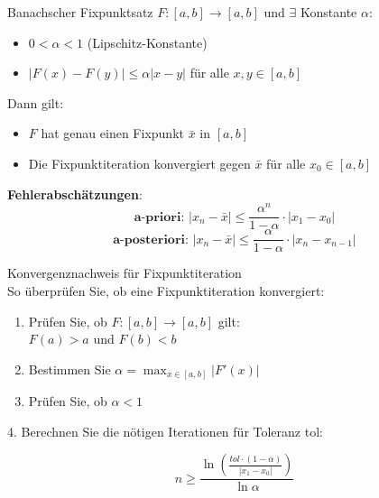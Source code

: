 \begin{lemma}{Banachscher Fixpunktsatz}
$F:[a,b] \rightarrow [a,b]$ und $\exists$ Konstante $\alpha$:
\begin{itemize}
    \item $0 < \alpha < 1$ (Lipschitz-Konstante)
    \item $|F(x)-F(y)| \leq \alpha|x-y|$ für alle $x,y \in [a,b]$
\end{itemize}
\vspace{2mm}


\begin{minipage}[t]{0.35\textwidth}
    Dann gilt:
\begin{itemize}
    \item $F$ hat genau einen Fixpunkt $\bar{x}$ in $[a,b]$
    \item Die Fixpunktiteration konvergiert gegen $\bar{x}$ für alle $x_0 \in [a,b]$
\end{itemize}
\end{minipage}
\hspace{2mm}
\begin{minipage}[t]{0.55\textwidth}
    \textbf{Fehlerabschätzungen}:
    \vspace{-2mm}\\
    $$\textbf{a-priori: } |x_n-\bar{x}| \leq \frac{\alpha^n}{1-\alpha} \cdot |x_1-x_0|$$
    $$\textbf{a-posteriori: } |x_n-\bar{x}| \leq \frac{\alpha}{1-\alpha} \cdot |x_n-x_{n-1}|$$
\end{minipage}
\end{lemma}

\begin{KR}{Konvergenznachweis für Fixpunktiteration}\\
So überprüfen Sie, ob eine Fixpunktiteration konvergiert:
\begin{enumerate}
    \item Prüfen Sie, ob $F:[a,b] \rightarrow [a,b]$ gilt:\\
           $F(a) > a$ und $F(b) < b$
    \item Bestimmen Sie $\alpha = \max_{x \in [a,b]} |F'(x)|$
    \item Prüfen Sie, ob $\alpha < 1$
\end{enumerate}

\begin{minipage}[t]{0.45\textwidth}
    4. Berechnen Sie die nötigen Iterationen für Toleranz tol:
\end{minipage}
\begin{minipage}[t]{0.45\textwidth}
    \vspace{-3mm}
$$n \geq \frac{\ln(\frac{tol \cdot (1-\alpha)}{|x_1-x_0|})}{\ln \alpha}$$
\end{minipage}
\end{KR}

